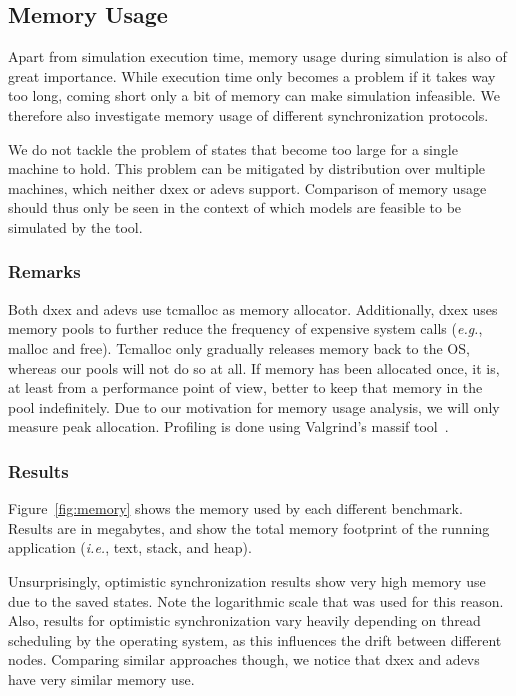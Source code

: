 \subsection{Memory Usage}
Apart from simulation execution time, memory usage during simulation is also of great importance.
While execution time only becomes a problem if it takes way too long, coming short only a bit of memory can make simulation infeasible.
We therefore also investigate memory usage of different synchronization protocols.

We do not tackle the problem of states that become too large for a single machine to hold.
This problem can be mitigated by distribution over multiple machines, which neither dxex or adevs support.
Comparison of memory usage should thus only be seen in the context of which models are feasible to be simulated by the tool.

\subsubsection{Remarks}
Both dxex and adevs use tcmalloc as memory allocator.
Additionally, dxex uses memory pools to further reduce the frequency of expensive system calls (\textit{e.g.}, malloc and free).
Tcmalloc only gradually releases memory back to the OS, whereas our pools will not do so at all.
If memory has been allocated once, it is, at least from a performance point of view, better to keep that memory in the pool indefinitely.
Due to our motivation for memory usage analysis, we will only measure peak allocation.
Profiling is done using Valgrind's massif tool~\cite{Nethercote:2007:VFH:1273442.1250746}.

\subsubsection{Results}
Figure~\ref{fig:memory} shows the memory used by each different benchmark.
Results are in megabytes, and show the total memory footprint of the running application (\textit{i.e.}, text, stack, and heap).

Unsurprisingly, optimistic synchronization results show very high memory use due to the saved states.
Note the logarithmic scale that was used for this reason.
Also, results for optimistic synchronization vary heavily depending on thread scheduling by the operating system, as this influences the drift between different nodes.
Comparing similar approaches though, we notice that dxex and adevs have very similar memory use.

